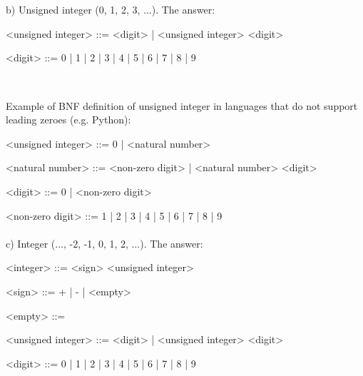 \documentclass{article}
\begin{document}
	

	
	\paragraph{}
	\rmfamily\
	
		b) Unsigned integer (0, 1, 2, 3, ...). The answer:
		
	\ttfamily
	\begin{grammar}
		
		<unsigned integer> ::= <digit> | <unsigned integer> <digit>

		<digit> ::= 0 | 1 | 2 | 3 | 4 | 5 | 6 | 7 | 8 | 9
		
	\end{grammar}

		\rmfamily\
	
		Example of BNF definition of unsigned integer in languages that do not support leading zeroes (e.g. Python):
			
	\ttfamily
	\begin{grammar}
		
		<unsigned integer> ::= 0 | <natural number>
		
		<natural number> ::= <non-zero digit> | <natural number> <digit>

		<digit> ::= 0 | <non-zero digit>

		<non-zero digit> ::= 1 | 2 | 3 | 4 | 5 | 6 | 7 | 8 | 9
		
	\end{grammar}




	\paragraph{}
	\rmfamily
	
		c) Integer (..., -2, -1, 0, 1, 2, ...). The answer:
			
	\ttfamily
	\begin{grammar}
	
		<integer> ::= <sign> <unsigned integer>
		
		<sign> ::= + | - | <empty>
		
		<empty> ::= \
		
		<unsigned integer> ::= <digit> | <unsigned integer> <digit>

		<digit> ::= 0 | 1 | 2 | 3 | 4 | 5 | 6 | 7 | 8 | 9

	\end{grammar}

		\rmfamily\
	
\end{document}
